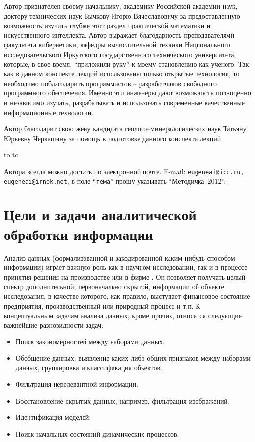 \documentclass[12pt, openany, twoside]{book} %
\begin{document}
Автор признателен своему начальнику, академику Российской академии наук, доктору технических наук Бычкову Игорю Вячеславовичу за предоставленную возможность изучить глубже этот раздел практической математики и искусственного интеллекта. Автор выражает благодарность преподавателями факультета кибернетики, кафедры вычислительной техники Национального исследовательского Иркутского государственного технического университета, которые, в свое время, ``приложили руку'' к моему становлению как ученого. Так как в данном конспекте лекций использованы только открытые технологии, то необходимо поблагодарить программистов -- разработчиков свободного программного обеспечения. Именно эти инженеры дают возможность полноценно и независимо изучать, разрабатывать и использовать современные качественные информационные технологии.

Автор благодарит свою жену кандидата геолого--минералогических наук Татьяну Юрьевну Черкашину за помощь в подготовке данного конспекта лекций.

\medskip
\noindent\hbox to \linewidth{\hfill\sf с.н.с. ИДСТУ СО РАН, доцента кафедры ВТ
ИрГТУ,}
\noindent\hbox to \linewidth{\hfill\sf к.т.н. Черкашин Е.А.}

\vfill
\makeatletter
{} Автора всегда можно достать по электронной почте. E-mail:
{\tt eugeneai@icc.ru, eugeneai@irnok.net}, в поле ``{\tt тема}'' прошу указывать ``Методичка--2012''.
\makeatother

\chapter{Цели и задачи аналитической обработки информации}

Анализ данных (формализованной и закодированной каким-нибудь способом информации) играет важную роль как в научном исследовании, так и в процессе принятия решения на производстве или в фирме . Он позволяет получать целый спектр дополнительной, первоначально скрытой,  информации об объекте исследования, в качестве которого, как правило, выступает финансовое состояние предприятия, производственный или природный процесс и т.п. К концептуальным задачам анализа данных, кроме прочих, относятся следующие важнейшие разновидности задач:
\begin{itemize}
\item Поиск закономерностей между наборами данных.
\item Обобщение данных: выявление каких-либо общих признаков между наборами данных, группировка и классификация объектов.
\item Фильтрация нерелевантной информации.
\item Восстановление скрытых данных, например, фильтрация изображений.
\item Идентификация моделей.
\item Поиск начальных состояний динамических процессов.
\end{itemize}
\end{document}
